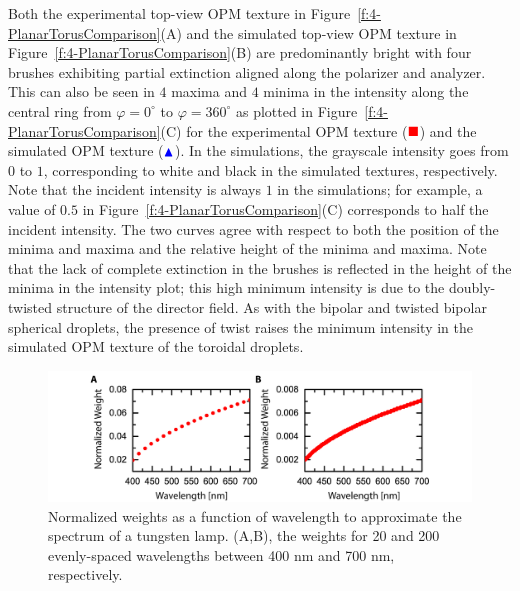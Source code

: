 Both the experimental top-view OPM texture in Figure~\ref{f:4-PlanarTorusComparison}(A) and the simulated top-view OPM texture in Figure~\ref{f:4-PlanarTorusComparison}(B) are predominantly bright with four brushes exhibiting partial extinction aligned along the polarizer and analyzer.
This can also be seen in $4$ maxima and $4$ minima in the intensity along the central ring from $\varphi=0^{\circ}$ to $\varphi=360^{\circ}$ as plotted in Figure~\ref{f:4-PlanarTorusComparison}(C) for the experimental OPM texture ($\color{red}\blacksquare$) and the simulated OPM texture ($\color{blue}\blacktriangle$).
In the simulations, the grayscale intensity goes from $0$ to $1$, corresponding to white and black in the simulated textures, respectively.
Note that the incident intensity is always $1$ in the simulations; for example, a value of $0.5$ in Figure~\ref{f:4-PlanarTorusComparison}(C) corresponds to half the incident intensity.
The two curves agree with respect to both the position of the minima and maxima and the relative height of the minima and maxima.
Note that the lack of complete extinction in the brushes is reflected in the height of the minima in the intensity plot; this high minimum intensity is due to the doubly-twisted structure of the director field.
As with the bipolar and twisted bipolar spherical droplets, the presence of twist raises the minimum intensity in the simulated OPM texture of the toroidal droplets.
\begin{figure}
  \includegraphics{figures/C4/Ch4-Figs_Spectrum.png}
  \caption{Normalized weights as a function of wavelength to approximate the spectrum of a tungsten lamp.
  (A,B), the weights for 20 and 200 evenly-spaced wavelengths between 400 nm and 700 nm, respectively.}\label{f:4-Spectrum}
\end{figure}

